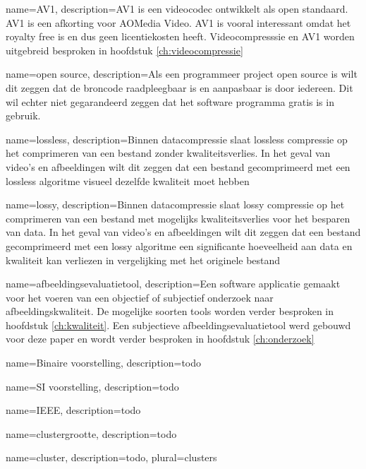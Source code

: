 {
	name={AV1},
	description={AV1 is een videocodec ontwikkelt als open standaard. AV1 is een afkorting voor AOMedia Video. AV1 is vooral interessant omdat het royalty free is en dus geen licentiekosten heeft. Videocompresssie en AV1 worden uitgebreid besproken in hoofdstuk \ref{ch:videocompressie}}
}

{
	name={open source},
	description={Als een programmeer project open source is wilt dit zeggen dat de broncode raadpleegbaar is en aanpasbaar is door iedereen. Dit wil echter niet gegarandeerd zeggen dat het software programma gratis is in gebruik.}
}

{
	name={lossless},
	description={Binnen datacompressie slaat lossless compressie op het comprimeren van een bestand zonder kwaliteitsverlies. In het geval van video's en afbeeldingen wilt dit zeggen dat een bestand gecomprimeerd met een lossless algoritme visueel dezelfde kwaliteit moet hebben}
}

{
	name={lossy},
	description={Binnen datacompressie slaat lossy compressie op het comprimeren van een bestand met mogelijks kwaliteitsverlies voor het besparen van data. In het geval van video's en afbeeldingen wilt dit zeggen dat een bestand gecomprimeerd met een lossy algoritme een significante hoeveelheid aan data en kwaliteit kan verliezen in vergelijking met het originele bestand}
}

{
	name={afbeeldingsevaluatietool},
	description={Een software applicatie gemaakt voor het voeren van een objectief of subjectief onderzoek naar afbeeldingskwaliteit. De mogelijke soorten tools worden verder besproken in hoofdstuk \ref{ch:kwaliteit}. Een subjectieve afbeeldingsevaluatietool werd gebouwd voor deze paper en wordt verder besproken in hoofdstuk \ref{ch:onderzoek}}
}

{
	name={Binaire voorstelling},
	description={todo}
}

{
	name={SI voorstelling},
	description={todo}
}

{
	name={IEEE},
	description={todo}
}

{
	name={clustergrootte},
	description={todo}
}

{
	name={cluster},
	description={todo},
	plural={clusters}
}

